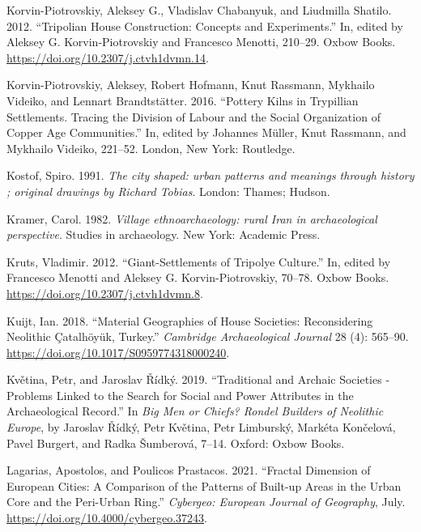 \documentclass[
  12pt,
  a4paper, twoside]{book}
\newlength{\cslhangindent}
\newlength{\cslentryspacingunit} %
\newenvironment{CSLReferences}[2] %
 {%
  \setlength{\parindent}{0pt}
  \ifodd #1
  \let\oldpar\par
  \def\par{\hangindent=\cslhangindent\oldpar}
  \fi
  \setlength{\parskip}{#2\cslentryspacingunit}
 }%
 {}
\begin{document}
\begin{CSLReferences}{1}{0}
\leavevmode{}%
Korvin-Piotrovskiy, Aleksey G., Vladislav Chabanyuk, and Liudmilla Shatilo. 2012. {``Tripolian House Construction: Concepts and Experiments.''} In, edited by Aleksey G. Korvin-Piotrovskiy and Francesco Menotti, 210--29. Oxbow Books. \url{https://doi.org/10.2307/j.ctvh1dvmn.14}.

\leavevmode{}%
Korvin-Piotrovskiy, Aleksey, Robert Hofmann, Knut Rassmann, Mykhailo Videiko, and Lennart Brandtstätter. 2016. {``Pottery Kilns in Trypillian Settlements. Tracing the Division of Labour and the Social Organization of Copper Age Communities.''} In, edited by Johannes Müller, Knut Rassmann, and Mykhailo Videiko, 221--52. London, New York: Routledge.

\leavevmode{}%
Kostof, Spiro. 1991. \emph{The city shaped: urban patterns and meanings through history ; original drawings by Richard Tobias}. London: Thames; Hudson.

\leavevmode{}%
Kramer, Carol. 1982. \emph{Village ethnoarchaeology: rural Iran in archaeological perspective}. Studies in archaeology. New York: Academic Press.

\leavevmode{}%
Kruts, Vladimir. 2012. {``Giant-Settlements of Tripolye Culture.''} In, edited by Francesco Menotti and Aleksey G. Korvin-Piotrovskiy, 70--78. Oxbow Books. \url{https://doi.org/10.2307/j.ctvh1dvmn.8}.

\leavevmode{}%
Kuijt, Ian. 2018. {``Material Geographies of House Societies: Reconsidering Neolithic Çatalhöyük, Turkey.''} \emph{Cambridge Archaeological Journal} 28 (4): 565--90. \url{https://doi.org/10.1017/S0959774318000240}.

\leavevmode{}%
Květina, Petr, and Jaroslav Řídký. 2019. {``Traditional and Archaic Societies - Problems Linked to the Search for Social and Power Attributes in the Archaeological Record.''} In \emph{Big Men or Chiefs? {Rondel} Builders of Neolithic {Europe}}, by Jaroslav Řídký, Petr Květina, Petr Limburský, Markéta Končelová, Pavel Burgert, and Radka Šumberová, 7--14. {Oxford}: {Oxbow Books}.

\leavevmode{}%
Lagarias, Apostolos, and Poulicos Prastacos. 2021. {``Fractal Dimension of European Cities: A Comparison of the Patterns of Built-up Areas in the Urban Core and the Peri-Urban Ring.''} \emph{Cybergeo: European Journal of Geography}, July. \url{https://doi.org/10.4000/cybergeo.37243}.


\end{CSLReferences}
\end{document}
